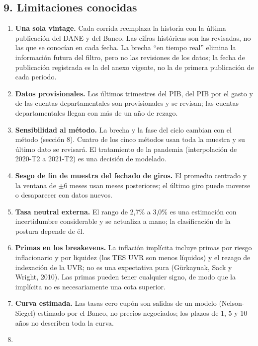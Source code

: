 \hypertarget{limitaciones-conocidas}{%
\subsection{9. Limitaciones conocidas}\label{limitaciones-conocidas}}

\begin{enumerate}
\def\labelenumi{\arabic{enumi}.}
\tightlist
\item
  \textbf{Una sola vintage.} Cada corrida reemplaza la historia con la
  última publicación del DANE y del Banco. Las cifras históricas son las
  revisadas, no las que se conocían en cada fecha. La brecha ``en tiempo
  real'' elimina la información futura del filtro, pero no las
  revisiones de los datos; la fecha de publicación registrada es la del
  anexo vigente, no la de primera publicación de cada periodo.
\item
  \textbf{Datos provisionales.} Los últimos trimestres del PIB, del PIB
  por el gasto y de las cuentas departamentales son provisionales y se
  revisan; las cuentas departamentales llegan con más de un año de
  rezago.
\item
  \textbf{Sensibilidad al método.} La brecha y la fase del ciclo cambian
  con el método (sección 8). Cuatro de los cinco métodos usan toda la
  muestra y su último dato se revisará. El tratamiento de la pandemia
  (interpolación de 2020-T2 a 2021-T2) es una decisión de modelado.
\item
  \textbf{Sesgo de fin de muestra del fechado de giros.} El promedio
  centrado y la ventana de \(\pm 6\) meses usan meses posteriores; el
  último giro puede moverse o desaparecer con datos nuevos.
\item
  \textbf{Tasa neutral externa.} El rango de 2,7\% a 3,0\% es una
  estimación con incertidumbre considerable y se actualiza a mano; la
  clasificación de la postura depende de él.
\item
  \textbf{Primas en los breakevens.} La inflación implícita incluye
  primas por riesgo inflacionario y por liquidez (los TES UVR son menos
  líquidos) y el rezago de indexación de la UVR; no es una expectativa
  pura (Gürkaynak, Sack y Wright, 2010). Las primas pueden tener
  cualquier signo, de modo que la implícita no es necesariamente una
  cota superior.
\item
  \textbf{Curva estimada.} Las tasas cero cupón son salidas de un modelo
  (Nelson-Siegel) estimado por el Banco, no precios negociados; los
  plazos de 1, 5 y 10 años no describen toda la curva.
\item

\end{enumerate}
